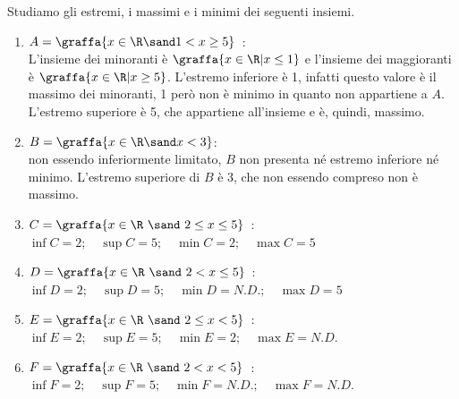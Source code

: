 \begin{esempio}Studiamo gli estremi, i massimi e i minimi dei seguenti 
insiemi. %
\begin{enumerate}
\item \(A = \graffa{x\in\R \sand 1 < x \geq 5}\)~: \\
L'insieme dei minoranti è \(\graffa{x\in\R\vert x \leq 1}\) e
l'insieme dei maggioranti è \(\graffa{x\in\R\vert x \geq 5}\).
L'estremo inferiore è 1, infatti questo valore è il massimo 
dei minoranti, 1 però non è minimo in quanto non appartiene a \(A\). 
L'estremo superiore è 5, che appartiene all'insieme e è, quindi, massimo. 
\item \(B =\graffa{x \in \R \sand x < 3}\): \\
non essendo inferiormente limitato, \(B\) non presenta né estremo inferiore 
né minimo. 
L'estremo superiore di \(B\) è 3, che non essendo compreso non è massimo.
\item \(C = \graffa{x\in\R~\sand~ 2 \leq x \leq 5}\)~: \\
\(\inf{C} = 2; \quad \sup{C} = 5; \quad \min{C} = 2; \quad \max{C} = 5\) 
\item \(D = \graffa{x\in\R~\sand~ 2 < x \leq 5}\)~: \\
\(\inf{D} = 2; \quad \sup{D} = 5; \quad \min{D} = N.D.; \quad \max{D} = 5\)
\item \(E = \graffa{x\in\R~\sand~ 2 \leq x < 5}\)~: \\
\(\inf{E} = 2; \quad \sup{E} = 5; \quad \min{E} = 2; \quad \max{E} = N.D.\)
\item \(F = \graffa{x\in\R~\sand~ 2 < x < 5}\)~: \\
\(\inf{F} = 2; \quad \sup{F} = 5;\quad \min{F} = N.D.;\quad 
  \max{F} = N.D.\)
\end{enumerate}
\end{esempio}

